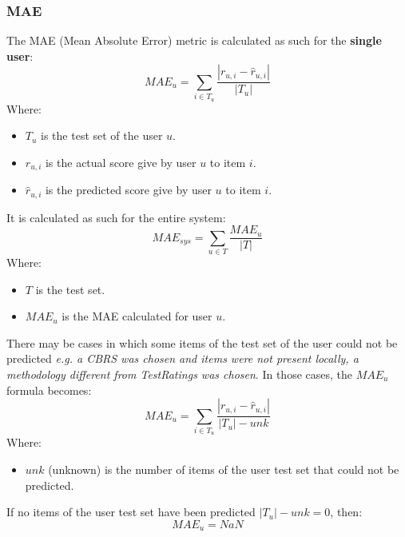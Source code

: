 \documentclass[11pt]{article}
\begin{document}
\subsubsection{MAE}\label{subsubsec:mae}
The MAE (Mean Absolute Error) metric is calculated as such for the \textbf{single user}:
\hfill\break
\hfill\break
    \[
        MAE_u = \sum_{i \in T_u} \frac{|r_{u,i} - \hat{r}_{u,i}|}{|T_u|}
    \]
\hfill\break
\hfill\break
    Where:
\begin{itemize}
    \item $T_u$ is the test set of the user $u$.
    \item $r_{u, i}$ is the actual score give by user $u$ to item $i$.
    \item $\hat{r}_{u, i}$ is the predicted score give by user $u$ to item $i$.
\end{itemize}
\hfill\break
\hfill\break
It is calculated as such for the entire system:
\hfill\break
\hfill\break
    \[
        MAE_{sys} = \sum_{u \in T} \frac{MAE_u}{|T|}
    \]
\hfill\break
\hfill\break
    Where:
\begin{itemize}
    \item $T$ is the test set.
    \item $MAE_u$ is the MAE calculated for user $u$.
\end{itemize}
\hfill\break
\hfill\break
There may be cases in which some items of the test set of the user could not be predicted
\textit{e.g. a CBRS was chosen and items were not present locally, a methodology different from TestRatings was chosen}.
In those cases, the $MAE_u$ formula becomes:
\hfill\break
\hfill\break
    \[
        MAE_u = \sum_{i \in T_u} \frac{|r_{u,i} - \hat{r}_{u,i}|}{|T_u| - unk}
    \]
\hfill\break
\hfill\break
    Where:
\begin{itemize}
    \item $unk$ (unknown) is the number of items of the user test set that could not be predicted.
\end{itemize}
\hfill\break
\hfill\break
If no items of the user test set have been predicted $|T_u| - unk = 0$, then:
\hfill\break
\hfill\break
    \[
        MAE_u = NaN
    \]
\hfill\break
\hfill\break

\end{document}
